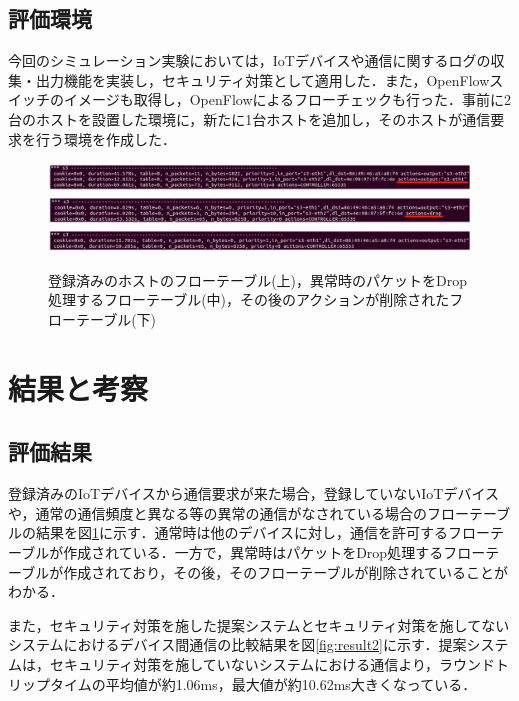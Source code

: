 \documentclass[a4paper,10pt,twocolumn,uplatex]{jsarticle}
\begin{document}
\subsection{評価環境}
今回のシミュレーション実験においては，IoTデバイスや通信に関するログの収集・出力機能を実装し，セキュリティ対策として適用した．また，OpenFlowスイッチのイメージも取得し，OpenFlowによるフローチェックも行った．事前に2台のホストを設置した環境に，新たに1台ホストを追加し，そのホストが通信要求を行う環境を作成した．


\begin{figure}[!tb]
  \centering
  \includegraphics[width=\linewidth]{img/result_flow4v3.eps}
  \includegraphics[width=\linewidth]{img/result_flow2v3.eps}
  \includegraphics[width=\linewidth]{img/result_flow3v2.eps}
  \caption{登録済みのホストのフローテーブル(上)，異常時のパケットをDrop処理するフローテーブル(中)，その後のアクションが削除されたフローテーブル(下)}
  \label{fig:result1}
\end{figure}

\section{結果と考察}
\subsection{評価結果}
登録済みのIoTデバイスから通信要求が来た場合，登録していないIoTデバイスや，通常の通信頻度と異なる等の異常の通信がなされている場合のフローテーブルの結果を図\ref{fig:result1}に示す．通常時は他のデバイスに対し，通信を許可するフローテーブルが作成されている．一方で，異常時はパケットをDrop処理するフローテーブルが作成されており，その後，そのフローテーブルが削除されていることがわかる．\par
また，セキュリティ対策を施した提案システムとセキュリティ対策を施してないシステムにおけるデバイス間通信の比較結果を図\ref{fig:result2}に示す．提案システムは，セキュリティ対策を施していないシステムにおける通信より，ラウンドトリップタイムの平均値が約1.06ms，最大値が約10.62ms大きくなっている．
\end{document}
